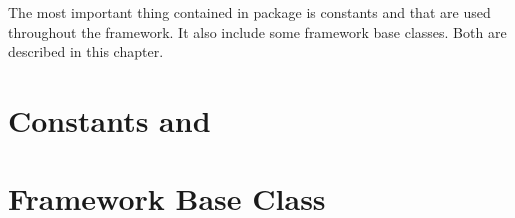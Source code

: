 
The most important thing contained in \Base package is constants and \enum that are used throughout the framework.
It also include some framework base classes. Both are described in this chapter.

\section{Constants and \enum}
\label{sec:constants}


\section{Framework Base Class}
\label{sec:baseclass}

